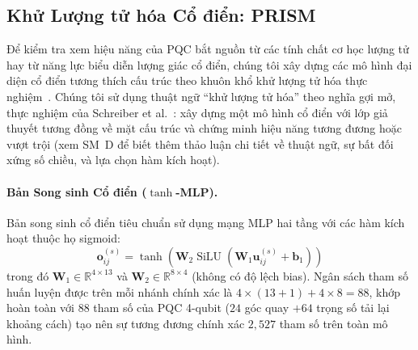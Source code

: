 \documentclass[10pt,twocolumn,letterpaper]{article}
\begin{document}
\subsection{Khử Lượng tử hóa Cổ điển: PRISM}
\label{sec:periodic_egnn}

Để kiểm tra xem hiệu năng của PQC bắt nguồn từ các tính chất cơ học lượng tử hay từ năng lực biểu diễn lượng giác cổ điển, chúng tôi xây dựng các mô hình đại diện cổ điển tương thích cấu trúc theo khuôn khổ khử lượng tử hóa thực nghiệm~\cite{Tang:2018lmw, Schreiber:2022roq, pegg2026isoqgnn}.
Chúng tôi sử dụng thuật ngữ ``khử lượng tử hóa'' theo nghĩa gợi mở, thực nghiệm của Schreiber et al.~\cite{Schreiber:2022roq}: xây dựng một mô hình cổ điển với lớp giả thuyết tương đồng về mặt cấu trúc và chứng minh hiệu năng tương đương hoặc vượt trội (xem SM~D để biết thêm thảo luận chi tiết về thuật ngữ, sự bất đối xứng số chiều, và lựa chọn hàm kích hoạt).

\paragraph{Bản Song sinh Cổ điển ($\tanh$-MLP).}
Bản song sinh cổ điển tiêu chuẩn sử dụng mạng MLP hai tầng với các hàm kích hoạt thuộc họ sigmoid:
\begin{equation}
    \mathbf{o}_{ij}^{(s)} = \tanh\left(\mathbf{W}_2 \operatorname{SiLU}(\mathbf{W}_1 \mathbf{u}_{ij}^{(s)} + \mathbf{b}_1)\right)
\end{equation}
trong đó $\mathbf{W}_1 \in \mathbb{R}^{4 \times 13}$ và $\mathbf{W}_2 \in \mathbb{R}^{8 \times 4}$ (không có độ lệch bias). Ngân sách tham số huấn luyện được trên mỗi nhánh chính xác là $4 \times (13 + 1) + 4 \times 8 = 88$, khớp hoàn toàn với 88 tham số của PQC 4-qubit ($24$ góc quay $+ 64$ trọng số tải lại khoảng cách) tạo nên sự tương đương chính xác $2{,}527$ tham số trên toàn mô hình.
\end{document}
